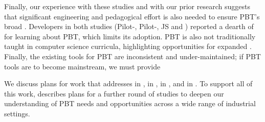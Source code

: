 Finally, our experience with these studies and with our prior research suggests
that significant engineering and pedagogical effort is also needed to ensure
PBT's broad .  Developers in both studies
(Pilot-, Pilot-, JS  and
) reported a dearth of  for
learning about PBT, which limits its adoption. PBT is also not traditionally
taught in computer science curricula, highlighting opportunities for expanded
. Finally, the existing tools for PBT are
inconsistent and under-maintained; if PBT tools are to become mainstream, we
must provide 

\iflater
{}%
%
We discuss plans for work that addresses  in ,  in
,
   in , and  in .  To support all of this work,
 describes plans for a further round of
studies to deepen our understanding of PBT needs and opportunities
across a wide range of industrial settings.
\fi

\iflater{}\fi




